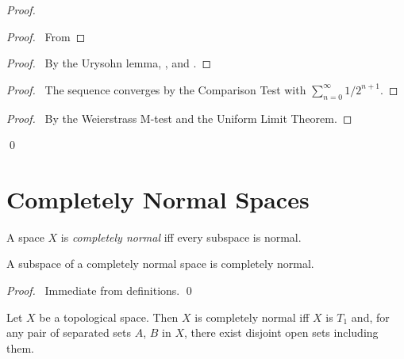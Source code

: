 \begin{proof}
 \pf
 \begin{proof}
   \pf\ From 
 \end{proof}
 \begin{proof}
   \pf\ By the Urysohn lemma,
   ,  and .
 \end{proof}
 \begin{proof}
   \pf\ The sequence converges by the Comparison Test with $\sum_{n=0}^\infty 1/2^{n+1}$.
 \end{proof}
 \begin{proof}
   \pf\ By the Weierstrass M-test and the Uniform Limit Theorem.
 \end{proof}
 \qed
\end{proof}

\section{Completely Normal Spaces}

  \begin{df}
  A space $X$ is \emph{completely normal} iff every subspace is normal.
\end{df}

    \begin{prop}
 A subspace of a completely normal space is completely normal.
\end{prop}

\begin{proof}
 \pf\ Immediate from definitions. \qed
\end{proof}

  \begin{prop}
  \label{prop:topology:completely_normal:characterisation}
 Let $X$ be a topological space. Then $X$ is completely normal iff $X$ is
$T_1$ and, for any pair of separated sets $A$, $B$ in $X$, there exist disjoint
open sets including them.
\end{prop}

